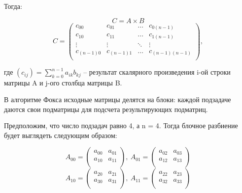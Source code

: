 \documentclass{article}
\begin{document}
Тогда:

\par
\[C=A \times B \]
\[
	C = \left( 
		\begin{matrix}
			c_{00} & c_{0 1} & \ldots & c_{0(n-1)}\\
			c_{10} & c_{1 1} & \ldots & c_{1(n-1)}\\
			\vdots & \vdots & \ddots & \vdots\\
			c_{(n-1)0} & c_{(n-1)1} & \ldots & c_{(n-1)(n-1)}\\
		\end{matrix}
	\right), 
\] 

\par
где $(c_{ij}) = \sum\limits_{k=0}^{n-1}a_{ik}b_{kj}$   – результат скалярного произведения i-ой строки матрицы A и j-ого столбца матрицы B.

\par В алгоритме Фокса исходные матрицы делятся на блоки: каждой подзадаче даются свои подматрицы для подсчета результирующих 
подматриц.

\par
Предположим, что число подзадач равно 4, а n = 4.
Тогда блочное разбиение будет выглядеть следующим образом:

\par
\[ A_{00}= \left( 
	\begin{matrix}
		a_{00}  &  a_{01}\\
		a_{10}  &  a_{11}\\
	\end{matrix}
\right),
~A_{01}= \left( 
	\begin{matrix}
		a_{02}  &   a_{03}\\
		a_{12}  &   a_{13}\\
	\end{matrix}
\right)\] 
\[ A_{10}= \left( 
	\begin{matrix}
		a_{20}  &  a_{21}\\
		a_{30}  &  a_{31}\\
	\end{matrix}
\right),
~A_{11}= \left( 
	\begin{matrix}
		a_{22}  &  a_{23}\\
		a_{32}  &  a_{33}\\
	\end{matrix}
\right)\]
\end{document}
